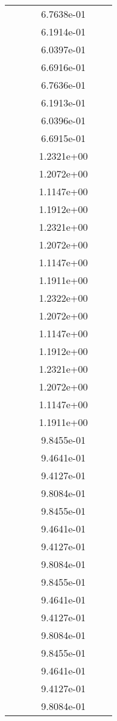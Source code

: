 \begin{xltabular}{\textwidth}{r|rS[table-format=1.3e+2]S[table-format=1.4e+2]S[table-format=1.4e+2]S[table-format=-1.5]}
&  &  & 6.7638e-01 & & \\
&  &  & 6.1914e-01 & & \\
&  &  & 6.0397e-01 & & \\
&  &  & 6.6916e-01 & & \\
&  &  & 6.7636e-01 & & \\
&  &  & 6.1913e-01 & & \\
&  &  & 6.0396e-01 & & \\
&  &  & 6.6915e-01 & & \\
&  &  & 1.2321e+00 & & \\
&  &  & 1.2072e+00 & & \\
&  &  & 1.1147e+00 & & \\
&  &  & 1.1912e+00 & & \\
&  &  & 1.2321e+00 & & \\
&  &  & 1.2072e+00 & & \\
&  &  & 1.1147e+00 & & \\
&  &  & 1.1911e+00 & & \\
&  &  & 1.2322e+00 & & \\
&  &  & 1.2072e+00 & & \\
&  &  & 1.1147e+00 & & \\
&  &  & 1.1912e+00 & & \\
&  &  & 1.2321e+00 & & \\
&  &  & 1.2072e+00 & & \\
&  &  & 1.1147e+00 & & \\
&  &  & 1.1911e+00 & & \\
&  &  & 9.8455e-01 & & \\
&  &  & 9.4641e-01 & & \\
&  &  & 9.4127e-01 & & \\
&  &  & 9.8084e-01 & & \\
&  &  & 9.8455e-01 & & \\
&  &  & 9.4641e-01 & & \\
&  &  & 9.4127e-01 & & \\
&  &  & 9.8084e-01 & & \\
&  &  & 9.8455e-01 & & \\
&  &  & 9.4641e-01 & & \\
&  &  & 9.4127e-01 & & \\
&  &  & 9.8084e-01 & & \\
&  &  & 9.8455e-01 & & \\
&  &  & 9.4641e-01 & & \\
&  &  & 9.4127e-01 & & \\
&  &  & 9.8084e-01 & & \\

\end{xltabular}
